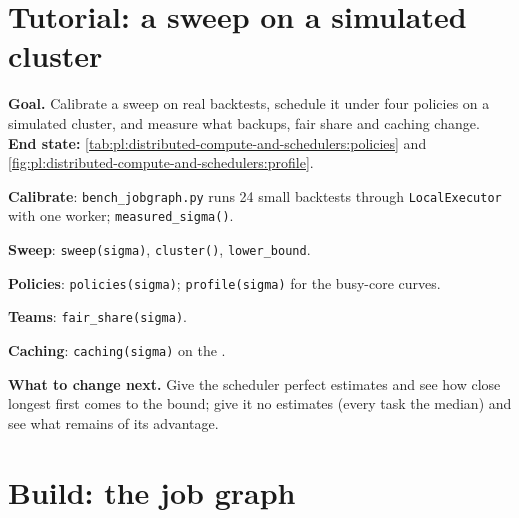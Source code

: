 \section{Tutorial: a sweep on a simulated cluster}\label{tut:pl:distributed-compute-and-schedulers:tut}

\begin{tutorial}
\textbf{Goal.} Calibrate a sweep on real backtests, schedule it under four policies on a simulated cluster, and measure what backups,
fair share and caching change. \textbf{End state:} \cref{tab:pl:distributed-compute-and-schedulers:policies} and
\cref{fig:pl:distributed-compute-and-schedulers:profile}.
\begin{tutsteps}
\item \textbf{Calibrate}: \texttt{bench\_jobgraph.py} runs 24 small backtests through \texttt{LocalExecutor} with one worker;
\texttt{measured\_sigma()}.
\item \textbf{Sweep}: \texttt{sweep(sigma)}, \texttt{cluster()}, \texttt{lower\_bound}.
\item \textbf{Policies}: \texttt{policies(sigma)}; \texttt{profile(sigma)} for the busy-core curves.
\item \textbf{Teams}: \texttt{fair\_share(sigma)}.
\item \textbf{Caching}: \texttt{caching(sigma)} on the .
\end{tutsteps}
\textbf{What to change next.} Give the scheduler perfect estimates and see how close longest first comes to the bound; give it no estimates
(every task the median) and see what remains of its advantage.
\end{tutorial}

\section{Build: the job graph}\label{bld:pl:distributed-compute-and-schedulers:jobgraph}

